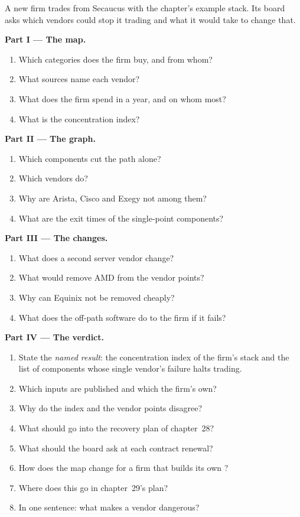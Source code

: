 \begin{problem}\label{pb:nw:the-vendor-map:1}
A new firm trades from Secaucus with the chapter's example stack. Its board asks which vendors could stop it trading and what it
would take to change that.

\medskip\noindent\textbf{Part I --- The map.}
\begin{enumerate}
\item Which categories does the firm buy, and from whom?
\item What sources name each vendor?
\item What does the firm spend in a year, and on whom most?
\item What is the concentration index?
\end{enumerate}

\medskip\noindent\textbf{Part II --- The graph.}
\begin{enumerate}[resume]
\item Which components cut the path alone?
\item Which vendors do?
\item Why are Arista, Cisco and Exegy not among them?
\item What are the exit times of the single-point components?
\end{enumerate}

\medskip\noindent\textbf{Part III --- The changes.}
\begin{enumerate}[resume]
\item What does a second server vendor change?
\item What would remove AMD from the vendor points?
\item Why can Equinix not be removed cheaply?
\item What does the off-path software do to the firm if it fails?
\end{enumerate}

\medskip\noindent\textbf{Part IV --- The verdict.}
\begin{enumerate}[resume]
\item State the \emph{named result}: the concentration index of the firm's stack and the list of components whose single vendor's
  failure halts trading.
\item Which inputs are published and which the firm's own?
\item Why do the index and the vendor points disagree?
\item What should go into the recovery plan of chapter~28?
\item What should the board ask at each contract renewal?
\item How does the map change for a firm that builds its own ?
\item Where does this go in chapter~29's plan?
\item In one sentence: what makes a vendor dangerous?
\end{enumerate}
\end{problem}

